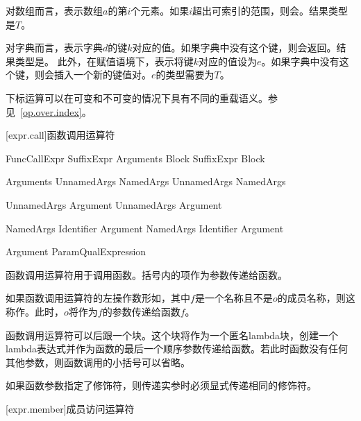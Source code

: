 \pnum
对数组而言，表示数组$a$的第$i$个元素。如果$i$超出可索引的范围，则会。结果类型是$T$。

\pnum
对字典而言，表示字典$d$的键$k$对应的值。如果字典中没有这个键，则会返回。结果类型是。
此外，在赋值语境下，表示将键$k$对应的值设为$e$。如果字典中没有这个键，则会插入一个新的键值对。$e$的类型需要为$T$。

\pnum
下标运算可以在可变和不可变的情况下具有不同的重载语义。参见~\ref{op.over.index}。

[expr.call]{函数调用运算符}

\begin{bnf}{FuncCallExpr}
    SuffixExpr \terminal{(} Arguments\bnfq \terminal{)} Block\bnfs \br
    SuffixExpr Block
\end{bnf}

\begin{bnf}{Arguments}
    UnnamedArgs \br
    NamedArgs \br
    UnnamedArgs \terminal{,} NamedArgs
\end{bnf}

\begin{bnf}{UnnamedArgs}
    Argument \br
    UnnamedArgs \terminal{,} Argument
\end{bnf}

\begin{bnf}{NamedArgs}
    Identifier \terminal{:} Argument \br
    NamedArgs \terminal{,} Identifier \terminal{:} Argument
\end{bnf}

\begin{bnf}{Argument}
    ParamQual\bnfq Expression
\end{bnf}

\pnum
函数调用运算符用于调用函数。括号内的项作为参数传递给函数。

\pnum
如果函数调用运算符的左操作数形如，其中$f$是一个名称且不是$o$的成员名称，则这称作。此时，$o$将作为$f$的参数传递给函数$f$。

\pnum
函数调用运算符可以后跟一个块。这个块将作为一个匿名lambda块，创建一个lambda表达式并作为函数的最后一个顺序参数传递给函数。若此时函数没有任何其他参数，则函数调用的小括号可以省略。

\pnum
如果函数参数指定了修饰符，则传递实参时必须显式传递相同的修饰符。

[expr.member]{成员访问运算符}

